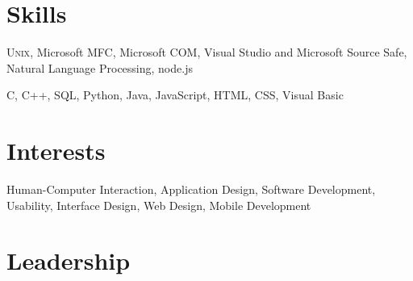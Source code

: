 \documentclass[margin,line,oneside,a4paper]{resume}
\begin{document}
\begin{resume}
   \section{\mysidestyle Skills}

   \begin{list2}
   \item \textsc{Unix}, Microsoft MFC, Microsoft COM, Visual Studio and Microsoft Source Safe, Natural Language Processing, node.js 
   \item C, C++, SQL, Python, Java, JavaScript, HTML, CSS, Visual Basic
   \end{list2}

   \section{\mysidestyle Interests}

   \begin{list2}
   \item Human-Computer Interaction, Application Design, Software Development, Usability, Interface Design, Web Design, Mobile Development
   \end{list2}


   \section{\mysidestyle Leadership}

   \vspace{-4mm}\\\vspace{1mm}

\end{resume}
\end{document}
